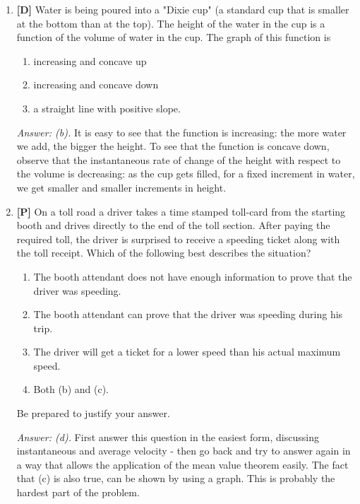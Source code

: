 \documentclass[12pt]{article}
\begin{document}
\begin{enumerate}
{\it Answer: False.} Students tend to believe this is a true statement. Point out an example when the statement does not hold, $f(x)=x^4$ at $a=0$ for example.

\bigskip

\item {\bf [D]} Water is being poured into a "Dixie cup" (a standard cup that 
is smaller at the bottom than at the top).  The height of the water 
in the cup is a function of the volume of water 
in the cup.  The graph of this function is
\begin{enumerate}
\item increasing and concave up
\item increasing and concave down
\item a straight line with positive slope.
\end{enumerate}

{\it Answer: (b).} It is easy to see that the function is increasing: the more water we add, the bigger the height. To see that the function is concave down, observe that the instantaneous rate of change of the height with respect to the volume is decreasing: as the cup gets filled, for a fixed increment in water, we get smaller and smaller increments in height.

\bigskip

\item {\bf [P]}
On a toll road a driver takes a time stamped toll-card from the starting
booth and drives directly to the end of the toll section.  After
paying the required toll, the driver is surprised to receive a
speeding ticket along with the toll receipt. Which of the
following best describes the situation?
\begin{enumerate}
\item The booth attendant does not have enough information to prove that the driver was
speeding.
\item The booth attendant can prove that the driver was speeding
during his trip.
\item The driver will get a ticket for a lower speed than his
actual maximum speed.
\item Both (b) and (c).
\end{enumerate}
Be prepared to justify your answer.

{\it Answer: (d).} First answer this question in the easiest
form, discussing instantaneous and average velocity - then go back
and try to answer again in a way that allows the application of
the mean value theorem easily. The fact that (c) is also true, can
be shown by using a graph. This is probably the hardest part of
the problem.


\end{enumerate}
\end{document}
